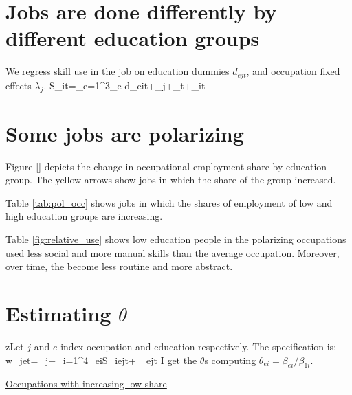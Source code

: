 \documentclass[a4paper, 12pt]{article}
\begin{document}
\section{Jobs are done differently by different education groups}

We regress skill use in the job on education dummies $d_{ejt}$, and occupation fixed effects $\lambda_j$.
\beqns
	S_{it}=\sum_{e=1}^{3}\beta_e d_{eit}+\lambda_j+\lambda_t+\varepsilon_{it}
\eeqns




\section{Some jobs are polarizing}
Figure [] depicts the change in occupational employment share by education group. The yellow arrows show jobs in which the share of the  group increased.

Table \ref{tab:pol_occ} shows jobs in which the shares of employment of low and high education groups are increasing.


Table \ref{fig:relative_use} shows low education people in the polarizing occupations used less social and more manual skills than the average occupation. Moreover, over time, the become less routine and more abstract.







\newcommand{\ntimes}{4 }

\section{Estimating $\theta$}
zLet $j$ and $e$ index occupation and education respectively. The specification is:
\beqns
	\Delta \ln w_{jet}=\lambda_j+\sum_{i=1}^{4}\beta_{ei}S_{iejt}+ \varepsilon_{ejt}
\eeqns
I get the $\theta$s computing $\theta_{ei}=\beta_{ei}/\beta_{1i}$.
{\tiny }
{\tiny }

\href{https://www.dropbox.com/s/dnt84rs90zac1h9/t_stats.txt?dl=0}{Occupations with increasing low share}





\end{document}
